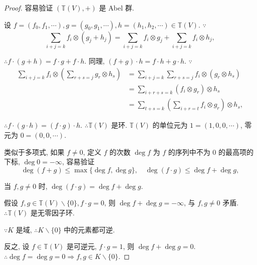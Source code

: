 \documentclass{ctexart}
\begin{document}
\begin{proof}
    容易验证 $(\mathbb{T}(V),+)$ 是 Abel 群.

    设 $f=(f_0,f_1,\cdots),g=(g_0,g_1,\cdots),h=(h_1,h_2,\cdots)\in\mathbb{T}(V)$. $\because$
    \[\sum\limits_{i+j=k}f_i\otimes(g_j+h_j)=\sum\limits_{i+j=k}f_i\otimes g_j+\sum\limits_{i+j=k}f_i\otimes h_j,\]

    $\therefore f\cdot(g+h)=f\cdot g+f\cdot h$. 同理, $(f+g)\cdot h=f\cdot h+g\cdot h$. $\because$
    \begin{align*}
        \sum\limits_{i+j=k}f_i\otimes\left(\sum\limits_{r+s=j}g_r\otimes h_s\right) & =\sum\limits_{i+j=k}\sum\limits_{r+s=j}f_i\otimes(g_r\otimes h_s) \\
        & =\sum\limits_{i+r+s=k}(f_i\otimes g_r)\otimes h_s \\
        & =\sum\limits_{t+s=k}\left(\sum\limits_{i+r=t}f_i\otimes g_r\right)\otimes h_s,
    \end{align*}

    $\therefore f\cdot(g\cdot h)=(f\cdot g)\cdot h$. $\therefore\mathbb{T}(V)$ 是环. $\mathbb{T}(V)$ 的单位元为 $1=(1,0,0,\cdots)$, 零元为 $0=(0,0,\cdots)$.

    类似于多项式, 如果 $f\neq0$, 定义 $f$ 的次数 $\deg f$ 为 $f$ 的序列中不为 $0$ 的最高项的下标, $\deg 0=-\infty$, 容易验证
    \[\deg(f+g)\leq\max\{\deg f,\deg g\},\quad\deg(f\cdot g)\leq\deg f+\deg g,\]

    当 $f,g\neq0$ 时, $\deg(f\cdot g)=\deg f+\deg g$.

    假设 $f,g\in\mathbb{T}(V)\backslash\{0\},f\cdot g=0$, 则 $\deg f+\deg g=-\infty$, 与 $f,g\neq0$ 矛盾. $\therefore\mathbb{T}(V)$ 是无零因子环.

    $\because K$ 是域, $\therefore K\backslash\{0\}$ 中的元素都可逆.

    反之, 设 $f\in\mathbb{T}(V)$ 是可逆元, $f\cdot g=1$, 则 $\deg f+\deg g=0$. $\therefore\deg f=\deg g=0\Rightarrow f,g\in K\backslash\{0\}$.
\end{proof}
\end{document}
